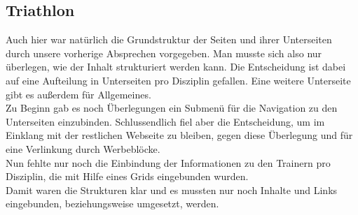 \documentclass[12pt,a4paper]{article}
\begin{document}
\subsection{Triathlon}
Auch hier war natürlich die Grundstruktur der Seiten und ihrer Unterseiten durch unsere vorherige Absprechen vorgegeben. Man musste sich also nur überlegen, wie der Inhalt strukturiert werden kann. Die Entscheidung ist dabei auf eine Aufteilung in Unterseiten pro Disziplin gefallen. Eine weitere Unterseite gibt es außerdem für Allgemeines. \\
Zu Beginn gab es noch Überlegungen ein Submenü für die Navigation zu den Unterseiten einzubinden. Schlussendlich fiel aber die Entscheidung, um im Einklang mit der restlichen Webseite zu bleiben, gegen diese Überlegung und für eine Verlinkung durch Werbeblöcke. \\
Nun fehlte nur noch die Einbindung der Informationen zu den Trainern pro Disziplin, die mit Hilfe eines Grids eingebunden wurden. \\
Damit waren die Strukturen klar und es mussten nur noch Inhalte und Links eingebunden, beziehungsweise umgesetzt, werden. 
\newpage
\end{document}
